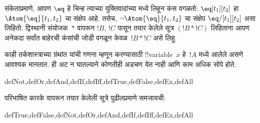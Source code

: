 \documentclass[../../../include/open-logic-section]{subfiles}
\begin{document}
संकेताप्रमाणे, आपण $\eq$ हे चिन्ह त्याच्या युक्तिवादांच्या मध्ये लिहून
कंस वगळतो: $\eq[t_1][t_2]$ हा $\Atom{\eq}{t_1,t_2}$ चा संक्षेप आहे.
तसेच, $\lnot \Atom{\eq}{t_1,t_2}$ चा संक्षेप $\eq/[t_1][t_2]$ असा
लिहितो. द्विस्थानी संयोजक~$\ast$ वापरून $!B$, $!C$ पासून तयार केलेले
सूत्र $(!B \ast !C)$ लिहिताना आपण अनेकदा सर्वांत बाहेरची कंसांची
जोडी वगळून केवळ~$!B \ast !C$ असे लिहू.

\begin{intro}
काही तर्कशास्त्राच्या ग्रंथांत
%
%
%
यांची गणना
 म्हणून करण्यासाठी
!!{variable}~$x$ हे~$!A$ मध्ये आलेले असणे आवश्यक मानतात. ही अट न
घातल्याने कोणतीही अडचण येत नाही आणि काम अधिक सोपे होते.
\end{intro}

\begin{tagblock}{defNot,defOr,defAnd,defIf,defIff,defTrue,defFalse,defEx,defAll}
\begin{defn}
परिभाषित कारके वापरून तयार केलेली सूत्रे पुढीलप्रमाणे समजायची:

\begin{tagenumerate}{defTrue,defFalse,defNot,defOr,defAnd,defIf,defIff,defEx,defAll}









\end{tagenumerate}
\end{defn}
\end{tagblock}
\end{document}
